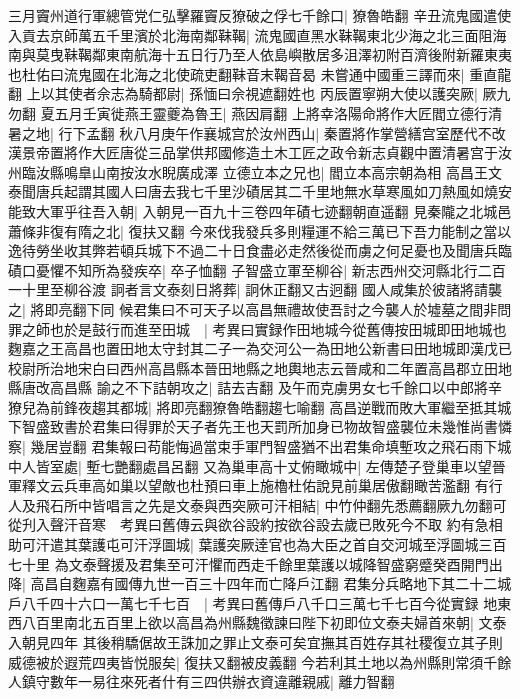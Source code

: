 三月竇州道行軍總管党仁弘擊羅竇反獠破之俘七千餘口|{
	獠魯皓翻}
辛丑流鬼國遣使入貢去京師萬五千里濱於北海南鄰靺鞨|{
	流鬼國直黑水靺鞨東北少海之北三面阻海南與莫曳靺鞨鄰東南航海十五日行乃至人依島嶼散居多沮澤初附百濟後附新羅東夷也杜佑曰流鬼國在北海之北使疏吏翻靺音末鞨音曷}
未嘗通中國重三譯而來|{
	重直龍翻}
上以其使者佘志為騎都尉|{
	孫愐曰佘視遮翻姓也}
丙辰置寧朔大使以護突厥|{
	厥九勿翻}
夏五月壬寅徙燕王靈夔為魯王|{
	燕因肩翻}
上將幸洛陽命將作大匠閻立德行清暑之地|{
	行下孟翻}
秋八月庚午作襄城宫於汝州西山|{
	秦置將作掌營繕宫室歷代不改漢景帝置將作大匠唐從三品掌供邦國修造土木工匠之政令新志貞觀中置清暑宫于汝州臨汝縣鳴臯山南按汝水睨廣成澤}
立德立本之兄也|{
	閻立本高宗朝為相}
高昌王文泰聞唐兵起謂其國人曰唐去我七千里沙磧居其二千里地無水草寒風如刀熱風如燒安能致大軍乎往吾入朝|{
	入朝見一百九十三卷四年磧七迹翻朝直遥翻}
見秦隴之北城邑蕭條非復有隋之北|{
	復扶又翻}
今來伐我發兵多則糧運不給三萬已下吾力能制之當以逸待勞坐收其弊若頓兵城下不過二十日食盡必走然後從而虜之何足憂也及聞唐兵臨磧口憂懼不知所為發疾卒|{
	卒子恤翻}
子智盛立軍至柳谷|{
	新志西州交河縣北行二百一十里至柳谷渡}
詗者言文泰刻日將葬|{
	詗休正翻又古迥翻}
國人咸集於彼諸將請襲之|{
	將即亮翻下同}
候君集曰不可天子以高昌無禮故使吾討之今襲人於墟墓之間非問罪之師也於是鼓行而進至田城　|{
	考異曰實録作田地城今從舊傳按田城即田地城也麴嘉之王高昌也置田地太守封其二子一為交河公一為田地公新書曰田地城即漢戊已校尉所治地宋白曰西州高昌縣本晉田地縣之地輿地志云晉咸和二年置高昌郡立田地縣唐改高昌縣}
諭之不下詰朝攻之|{
	詰去吉翻}
及午而克虜男女七千餘口以中郎將辛獠兒為前鋒夜趨其都城|{
	將即亮翻獠魯皓翻趨七喻翻}
高昌逆戰而敗大軍繼至抵其城下智盛致書於君集曰得罪於天子者先王也天罰所加身已物故智盛襲位未幾惟尚書憐察|{
	幾居豈翻}
君集報曰苟能悔過當束手軍門智盛猶不出君集命填塹攻之飛石雨下城中人皆室處|{
	塹七艷翻處昌呂翻}
又為巢車高十丈俯瞰城中|{
	左傳楚子登巢車以望晉軍釋文云兵車高如巢以望敵也杜預曰車上施櫓杜佑說見前巢居傲翻瞰苦濫翻}
有行人及飛石所中皆唱言之先是文泰與西突厥可汗相結|{
	中竹仲翻先悉薦翻厥九勿翻可從刋入聲汗音寒　考異曰舊傳云與欲谷設約按欲谷設去歲已敗死今不取}
約有急相助可汗遣其葉護屯可汗浮圖城|{
	葉護突厥逹官也為大臣之首自交河城至浮圖城三百七十里}
為文泰聲援及君集至可汗懼而西走千餘里葉護以城降智盛窮蹙癸酉開門出降|{
	高昌自麴嘉有國傳九世一百三十四年而亡降戶江翻}
君集分兵略地下其二十二城戶八千四十六口一萬七千七百　|{
	考異曰舊傳戶八千口三萬七千七百今從實録}
地東西八百里南北五百里上欲以高昌為州縣魏徵諫曰陛下初即位文泰夫婦首來朝|{
	文泰入朝見四年}
其後稍驕倨故王誅加之罪止文泰可矣宜撫其百姓存其社稷復立其子則威德被於遐荒四夷皆悦服矣|{
	復扶又翻被皮義翻}
今若利其土地以為州縣則常須千餘人鎮守數年一易往來死者什有三四供辦衣資違離親戚|{
	離力智翻}

